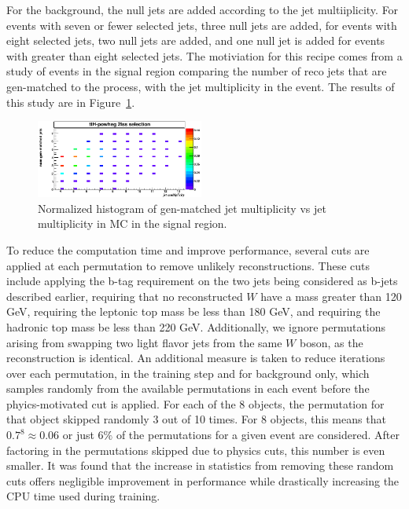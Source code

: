 For the background, the null jets are added according to the
jet multiiplicity. For events with seven or fewer selected jets, three null jets are
added, for events with eight selected jets, two null jets are added, and one null jet
is added for events with greater than eight selected jets. The motiviation for this recipe
comes from a study of \tth events in the signal region comparing the number of reco jets that are
gen-matched to the \tth process, with the jet multiplicity in the event. The results of this study are
in Figure~\ref{fig:jet_matching}. 

\begin{figure}[htp]
\centering
\includegraphics[width=0.49\textwidth]{ch9_figs/jet_matching.png}
\caption[Comparison of gen-matched jet multiplicity to jet multiplicity in signal events]{ Normalized histogram of gen-matched jet multiplicity vs jet multiplicity in \tth MC in the signal region.}
\label{fig:jet_matching}
\end{figure}

To reduce the computation time and improve performance,
several cuts are applied at each permutation to remove unlikely reconstructions.
These cuts include applying the b-tag requirement on the two jets being considered
as b-jets described earlier, requiring that no
reconstructed $W$ have a mass greater than 120 GeV, requiring the leptonic top mass
be less than 180 GeV, and requiring 
the hadronic top mass be less than 220 GeV. Additionally, we ignore permutations
arising from swapping two light flavor jets from the same $W$ boson, as the reconstruction is
identical.
An additional measure is taken to reduce iterations over each permutation, in the training step and for background only,
which samples randomly from the available permutations in each event before the phyics-motivated cut is applied.
For each of the 8 objects, the permutation for that object skipped randomly 3 out of 10 times. For 8 objects,
this means that $0.7^{8} \approx 0.06$ or just 6$\%$ of the permutations for a given event are considered. After factoring
in the permutations skipped due to physics cuts, this number is even smaller. It was found that the increase in statistics
from removing these random cuts offers negligible improvement in performance while drastically increasing the CPU time used
during training.

